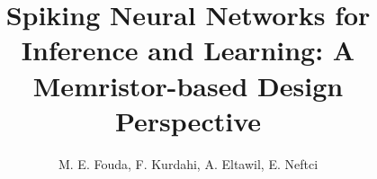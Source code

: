 \documentclass[english]{article}
\begin{document}


\title{Spiking Neural Networks for Inference and Learning: A Memristor-based Design Perspective}
\author{M. E. Fouda, F. Kurdahi, A. Eltawil, E. Neftci}
\maketitle

\begin{abstract}


\end{abstract}
\end{document}
